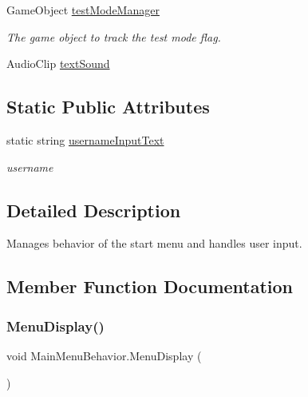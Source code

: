 \begin{DoxyCompactItemize}
Game\+Object \mbox{\hyperlink{class_main_menu_behavior_aad4443484303f9fc85e36843c7ac986c}{test\+Mode\+Manager}}
\begin{DoxyCompactList}\small\item\em The game object to track the test mode flag. \end{DoxyCompactList}\item 
Audio\+Clip \mbox{\hyperlink{class_main_menu_behavior_ac27a647f3d33f8f028673a5f3dfff869}{text\+Sound}}
\end{DoxyCompactItemize}
\subsection*{Static Public Attributes}
\begin{DoxyCompactItemize}
\item 
static string \mbox{\hyperlink{class_main_menu_behavior_a73338f524bbbf5b8637e12dd911a04f5}{username\+Input\+Text}}
\begin{DoxyCompactList}\small\item\em username \end{DoxyCompactList}\end{DoxyCompactItemize}


\subsection{Detailed Description}
Manages behavior of the start menu and handles user input. 

\subsection{Member Function Documentation}
\mbox{\label{class_main_menu_behavior_a8f404fbb0c8212fa405a7c79a051e120}} 
\subsubsection{\texorpdfstring{MenuDisplay()}{MenuDisplay()}}
{\footnotesize\ttfamily void Main\+Menu\+Behavior.\+Menu\+Display (\begin{DoxyParamCaption}{ }\end{DoxyParamCaption})}

\mbox{\label{class_main_menu_behavior_ae01826edae2c48636a5ba76bfa193ea6}} 
